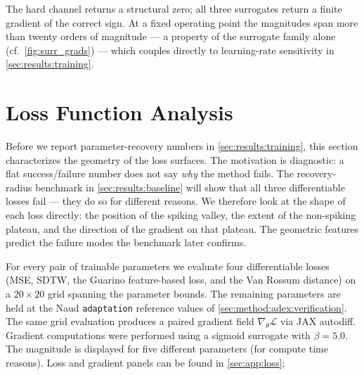 The hard channel returns a structural zero; all three surrogates return a finite gradient of the correct sign.
At a fixed operating point the magnitudes span more than twenty orders of magnitude --- a property of the surrogate family alone (cf.\ \cref{fig:surr_grads}) --- which couples directly to learning-rate sensitivity in \cref{sec:results:training}.

\section{Loss Function Analysis}\label{sec:results:landscape}

Before we report parameter-recovery numbers in \cref{sec:results:training}, this section characterizes the geometry of the loss surfaces.
The motivation is diagnostic: a flat success/failure number does not say \emph{why} the method fails.
The recovery-radius benchmark in \cref{sec:results:baseline} will show that all three differentiable losses fail --- they do so for different reasons.
We therefore look at the shape of each loss directly: the position of the spiking valley, the extent of the non-spiking plateau, and the direction of the gradient on that plateau.
The geometric features predict the failure modes the benchmark later confirms.

For every pair of trainable parameters we evaluate four differentiable losses (\gls{MSE}, \gls{SDTW}, the Guarino feature-based loss, and the Van Rossum distance) on a $20\times 20$ grid spanning the parameter bounds.
The remaining parameters are held at the Naud \texttt{adaptation} reference values of \cref{sec:method:adex:verification}.
The same grid evaluation produces a paired gradient field $\nabla_{\theta}\mathcal{L}$ via JAX autodiff.
Gradient computations were performed using a sigmoid surrogate with $\beta = 5.0$.
The magnitude is displayed for five different parameters (for compute time reasons).
Loss and gradient panels can be found in \cref{sec:app:loss};

